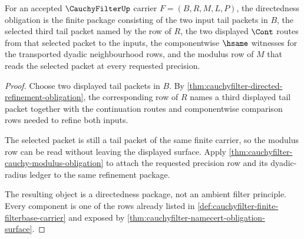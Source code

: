 \begin{theorem}
\label{thm:cauchyfilter-refinement-directedness-package}
For an accepted $\CauchyFilterUp$ carrier $F=(B,R,M,L,P)$, the directedness
obligation is the finite package consisting of the two input tail packets in
$B$, the selected third tail packet named by the row of $R$, the two displayed
$\Cont$ routes from that selected packet to the inputs, the componentwise
$\hsame$ witnesses for the transported dyadic neighbourhood rows, and the
modulus row of $M$ that reads the selected packet at every requested precision.
\end{theorem}
\begin{proof}
Choose two displayed tail packets in $B$. By
\autoref{thm:cauchyfilter-directed-refinement-obligation}, the corresponding
row of $R$ names a third displayed tail packet together with the continuation
routes and componentwise comparison rows needed to refine both inputs.

The selected packet is still a tail packet of the same finite carrier, so the
modulus row can be read without leaving the displayed surface. Apply
\autoref{thm:cauchyfilter-cauchy-modulus-obligation} to attach the requested
precision row and its dyadic-radius ledger to the same refinement package.

The resulting object is a directedness package, not an ambient filter
principle. Every component is one of the rows already listed in
\autoref{def:cauchyfilter-finite-filterbase-carrier} and exposed by
\autoref{thm:cauchyfilter-namecert-obligation-surface}.
\end{proof}

